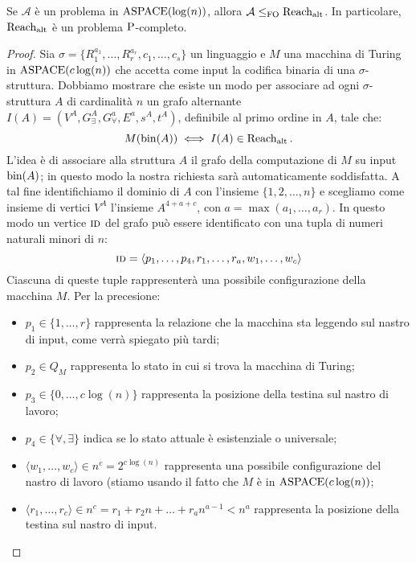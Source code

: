 \begin{proposizione}
 Se $\mathcal{A}$ è un problema in $\ASPACE(\log(n))$, allora $\mathcal{A} \leq_{\FO} \Ralt$.
 In particolare, $\Ralt$ è un problema $\P$-completo.
\end{proposizione}
\begin{proof}
 Sia $\sigma = \{R^{a_1}_1,\ldots,R^{a_r}_r,c_1, \ldots, c_s\}$ un linguaggio
 e $M$ una macchina di Turing in $\ASPACE(c \log(n))$ che accetta come input
 la codifica binaria di una $\sigma$-struttura. Dobbiamo mostrare che esiste un
 modo per associare ad ogni $\sigma$-struttura $A$ di cardinalità $n$ un grafo alternante
 $I(A) = (V^A, G_\exists^A, G_\forall^a, E^a, s^A,t^A)$,
 definibile al primo ordine in $A$, tale che:
 \[ M(\bin(A)) \iff I(A) \in \Ralt. \]
 L'idea è di associare alla struttura $A$ il grafo della computazione
 di $M$ su input $\bin(A)$; in questo modo la nostra richiesta sarà
 automaticamente soddisfatta.
 A tal fine identifichiamo il dominio di $A$ con l'insieme $\{1,2,\ldots, n\}$ e
 scegliamo come insieme di vertici $V^A$ l'insieme $A^{4+a+c}$,
 con $a=\max(a_1, \ldots, a_r)$. In questo modo
 un vertice $\ID$ del grafo può essere identificato con una tupla di numeri naturali
 minori di $n$:
 \[\ID=\langle p_1, \ldots, p_4, r_1, \ldots, r_a, w_1, \ldots, w_c \rangle\]
 Ciascuna di queste tuple rappresenterà una possibile configurazione della
 macchina $M$. Per la precesione:
 \begin{itemize}
  \item $p_1 \in \{1,\ldots, r\}$ rappresenta la relazione che la
  macchina sta leggendo sul nastro di input, come verrà spiegato più tardi;
  \item $p_2 \in Q_M$ rappresenta lo stato in cui si trova la macchina di Turing;
  \item $p_3 \in \{0, \ldots, c \log(n)\}$ rappresenta la posizione della testina
  sul nastro di lavoro;
  \item $p_4 \in \{\forall, \exists\}$ indica se lo stato attuale è esistenziale
  o universale;
  \item $\langle w_1, \ldots, w_c \rangle \in n^c = 2^{c \log (n)}$ rappresenta
  una possibile configurazione del nastro di lavoro (stiamo usando
  il fatto che $M$ è in $\ASPACE(c \log(n))$;
  \item $\langle r_1, \ldots, r_c \rangle \in n^c = r_1 + r_2 n + \ldots + r_a n^{a-1} < n^a$
  rappresenta la posizione della testina sul nastro di input.
 \end{itemize}
  

\end{proof}
